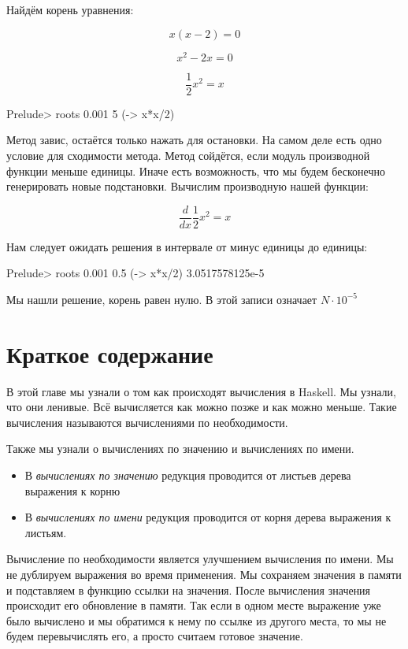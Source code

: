
Найдём корень уравнения:

\[x (x-2) = 0\]

\[x^2 - 2 x = 0\]

\[\frac{1}{2} x^2 = x\]


\begin{code}
Prelude> roots 0.001 5 (\x -> x*x/2)
\end{code}

Метод завис, остаётся только нажать  для остановки. На самом
деле есть одно условие для сходимости метода. Метод сойдётся, если
модуль производной функции  меньше единицы. Иначе есть
возможность, что мы будем бесконечно генерировать новые подстановки.
Вычислим производную нашей функции:

\[\frac{d}{dx} \frac{1}{2} x^2 = x\]

Нам следует ожидать решения в интервале от минус единицы до единицы:


\begin{code}
Prelude> roots 0.001 0.5 (\x -> x*x/2)
3.0517578125e-5
\end{code}

Мы нашли решение, корень равен нулю. В этой записи  означает
$N ^{-5}$

\section{Краткое содержание}

В этой главе мы узнали о том как происходят вычисления в Haskell. Мы
узнали, что они ленивые. Всё вычисляется как можно позже и как можно
меньше. Такие вычисления называются вычислениями по необходимости.

Также мы узнали о вычислениях по значению и вычислениях по имени.

\begin{itemize}
\item
  В \emph{вычислениях по значению} редукция проводится от листьев дерева
  выражения к корню
\item
  В \emph{вычислениях по имени} редукция проводится от корня дерева
  выражения к листьям.
\end{itemize}

Вычисление по необходимости является улучшением вычисления по имени. Мы
не дублируем выражения во время применения. Мы сохраняем значения в
памяти и подставляем в функцию ссылки на значения. После вычисления
значения происходит его обновление в памяти. Так если в одном месте
выражение уже было вычислено и мы обратимся к нему по ссылке из другого
места, то мы не будем перевычислять его, а просто считаем готовое
значение.

